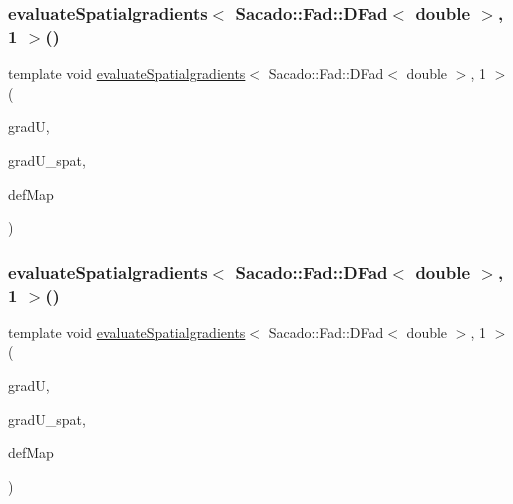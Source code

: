 \mbox{\label{function_evaluations_8cc_a63fd1422475c69c324aefec06a9b4fa0}} 
\subsubsection{\texorpdfstring{evaluateSpatialgradients$<$ Sacado::Fad::DFad$<$ double $>$, 1 $>$()}{evaluateSpatialgradients< Sacado::Fad::DFad< double >, 1 >()}\hspace{0.1cm}{\footnotesize\ttfamily [1/2]}}
{\footnotesize\ttfamily template void \mbox{\hyperlink{group___evaluation_functions_ga0b976342d491f6215953e2e65ea6a0de}{evaluate\+Spatialgradients}}$<$ Sacado\+::\+Fad\+::\+D\+Fad$<$ double $>$, 1 $>$ (\begin{DoxyParamCaption}\item[{Table$<$ 2, Sacado\+::\+Fad\+::\+D\+Fad$<$ double $>$$>$ \&}]{gradU,  }\item[{Table$<$ 2, Sacado\+::\+Fad\+::\+D\+Fad$<$ double $>$$>$}]{grad\+U\+\_\+spat,  }\item[{\mbox{\hyperlink{structdeformation_map}{deformation\+Map}}$<$ Sacado\+::\+Fad\+::\+D\+Fad$<$ double $>$, 1 $>$ \&}]{def\+Map }\end{DoxyParamCaption})}

\mbox{\label{function_evaluations_8cc_a31257b0c4b710fb48bf0b70e7b262da9}} 
\subsubsection{\texorpdfstring{evaluateSpatialgradients$<$ Sacado::Fad::DFad$<$ double $>$, 1 $>$()}{evaluateSpatialgradients< Sacado::Fad::DFad< double >, 1 >()}\hspace{0.1cm}{\footnotesize\ttfamily [2/2]}}
{\footnotesize\ttfamily template void \mbox{\hyperlink{group___evaluation_functions_ga0b976342d491f6215953e2e65ea6a0de}{evaluate\+Spatialgradients}}$<$ Sacado\+::\+Fad\+::\+D\+Fad$<$ double $>$, 1 $>$ (\begin{DoxyParamCaption}\item[{Table$<$ 3, Sacado\+::\+Fad\+::\+D\+Fad$<$ double $>$$>$ \&}]{gradU,  }\item[{Table$<$ 3, Sacado\+::\+Fad\+::\+D\+Fad$<$ double $>$$>$}]{grad\+U\+\_\+spat,  }\item[{\mbox{\hyperlink{structdeformation_map}{deformation\+Map}}$<$ Sacado\+::\+Fad\+::\+D\+Fad$<$ double $>$, 1 $>$ \&}]{def\+Map }\end{DoxyParamCaption})}

